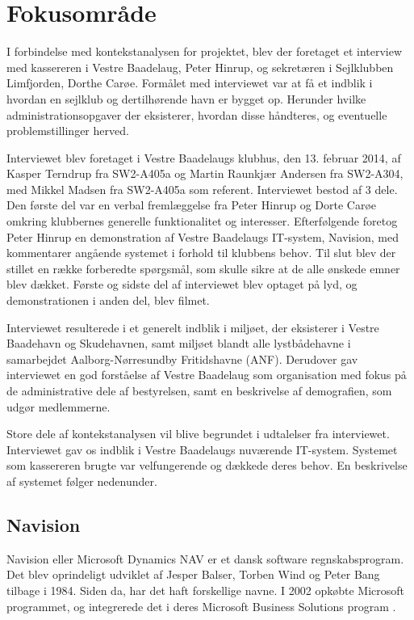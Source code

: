 
\section{Fokusområde} %

I forbindelse med kontekstanalysen for projektet, blev der foretaget et interview med kassereren i Vestre Baadelaug, Peter Hinrup, og sekretæren i Sejlklubben Limfjorden, Dorthe Carøe. Formålet med interviewet var at få et indblik i hvordan en sejlklub og dertilhørende havn er bygget op. Herunder hvilke administrationsopgaver der eksisterer, hvordan disse håndteres, og eventuelle problemstillinger herved. 

Interviewet blev foretaget i Vestre Baadelaugs klubhus, den 13. februar 2014, af Kasper Terndrup fra SW2-A405a og Martin Raunkjær Andersen fra SW2-A304, med Mikkel Madsen fra SW2-A405a som referent. Interviewet bestod af 3 dele. Den første del var en verbal fremlæggelse fra Peter Hinrup og Dorte Carøe omkring klubbernes generelle funktionalitet og interesser. Efterfølgende foretog Peter Hinrup en demonstration af Vestre Baadelaugs IT-system, Navision, med kommentarer angående systemet i forhold til klubbens behov. Til slut blev der stillet en række forberedte spørgsmål, som skulle sikre at de alle ønskede emner blev dækket. Første og sidste del af interviewet blev optaget på lyd, og demonstrationen i anden del, blev filmet.

Interviewet resulterede i et generelt indblik i miljøet, der eksisterer i Vestre Baadehavn og Skudehavnen, samt miljøet blandt alle lystbådehavne i samarbejdet Aalborg-Nørresundby Fritidshavne (ANF). Derudover gav interviewet en god forståelse af Vestre Baadelaug som organisation med fokus på de administrative dele af bestyrelsen, samt en beskrivelse af demografien, som udgør medlemmerne.

Store dele af kontekstanalysen vil blive begrundet i udtalelser fra interviewet. Interviewet gav os indblik i Vestre Baadelaugs nuværende IT-system. Systemet som kassereren brugte var velfungerende og dækkede deres behov. En beskrivelse af systemet følger nedenunder. 

\subsection{Navision} %
\label{sub:Navision}

Navision eller Microsoft Dynamics NAV er et dansk software regnskabsprogram. Det blev oprindeligt udviklet af Jesper Balser, Torben Wind og Peter Bang tilbage i 1984. Siden da, har det haft forskellige navne. I 2002 opkøbte Microsoft programmet, og integrerede det i deres Microsoft Business Solutions program \cite{visiondata}.

